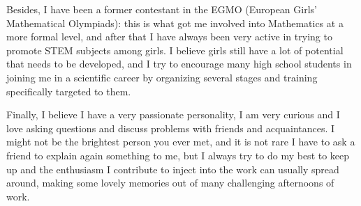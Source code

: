 \documentclass[12pt, a4paper]{article}
\begin{document}
Besides, I have been a former contestant in the EGMO (European Girls' Mathematical Olympiads): this is what got me involved into Mathematics at a more formal level, and after that I have always been very active in trying to promote STEM subjects among girls. I believe girls still have a lot of potential that needs to be developed, and I try to encourage many high school students in joining me in a scientific career by organizing several stages and training specifically targeted to them.

Finally, I believe I have a very passionate personality, I am very curious and I love asking questions and discuss problems with friends and acquaintances. I might not be the brightest person you ever met, and it is not rare I have to ask a friend to explain again something to me, but I always try to do my best to keep up and the enthusiasm I contribute to inject into the work can usually spread around, making some lovely memories out of many challenging afternoons of work.
\end{document}
